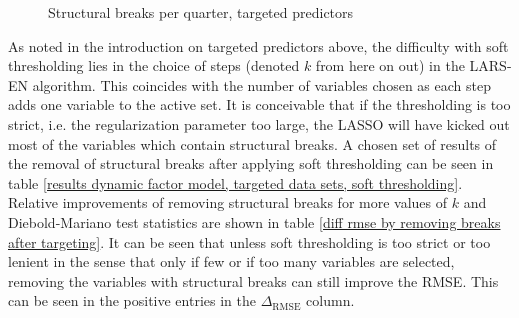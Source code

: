 \documentclass[12pt]{article}
\begin{document}
\begin{figure}[htp]
\centering
{}
\caption{Structural breaks per quarter, targeted predictors}
\label{structural breaks per period, targeted predictors}
\end{figure}



\clearpage

As noted in the introduction on targeted predictors above, the difficulty with soft thresholding lies in the choice of steps (denoted $k$ from here on out) in the LARS-EN algorithm. This coincides with the number of variables chosen as each step adds one variable to the active set. It is conceivable that if the thresholding is too strict, i.e. the regularization parameter too large, the LASSO will have kicked out most of the variables which contain structural breaks. A chosen set of results of the removal of structural breaks after applying soft thresholding can be seen in table \ref{results dynamic factor model, targeted data sets, soft thresholding}. Relative improvements of removing structural breaks for more values of $k$ and Diebold-Mariano test statistics are shown in table \ref{diff rmse by removing breaks after targeting}. It can be seen that unless soft thresholding is too strict or too lenient in the sense that only if few or if too many variables are selected, removing the variables with structural breaks can still improve the RMSE. This can be seen in the positive entries in the $\Delta_{\text{RMSE}}$ column.
\end{document}
